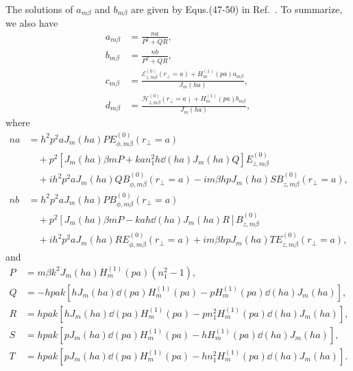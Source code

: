 The solutions of $a_{m\beta}$ and $b_{m\beta}$ are given by Equs.(47-50) in Ref.~\cite{Klimov2004}. To summarize, we also have
\begin{align}
a_{m\beta} &= \frac{na}{P^2+QR},\\
b_{m\beta} &= \frac{nb}{P^2+QR},\\
c_{m\beta} &= \frac{\mathcal{E}_{z,m\beta}^{(0)}(r\!_\perp\!=\!a)+ H_m^{(1)}(pa)a_{m\beta}}{J_m(ha)},\\
d_{m\beta} &= \frac{\mathcal{H}_{z,m\beta}^{(0)}(r\!_\perp\!=\!a)+ H_m^{(1)}(pa)b_{m\beta}}{J_m(ha)},
\end{align}
where
\begin{align}
na &= h^2p^2aJ_m(ha)PE_{\phi,m\beta}^{(0)}(r\!_\perp\!=\!a) \nonumber\\
&\quad + p^2\left[J_m(ha)\beta mP+kan_1^2h \dd{}{(ha)}J_m(ha)Q \right] E_{z,m\beta}^{(0)} \nonumber\\
&\quad + ih^2p^2 aJ_m(ha)QB_{\phi,m\beta}^{(0)}(r\!_\perp\!\!=\!a) \!-\! im\beta hpJ_m(ha)SB_{z,m\beta}^{(0)}(r\!_\perp\!\!=\!a),\\
nb &= h^2p^2aJ_m(ha)PB_{\phi,m\beta}^{(0)}(r\!_\perp\!=\!a) \nonumber\\
&\quad + p^2\left[J_m(ha)\beta mP-kah \dd{}{(ha)}J_m(ha)R \right] B_{z,m\beta}^{(0)} \nonumber\\
&\quad + ih^2p^2 aJ_m(ha)RE_{\phi,m\beta}^{(0)}(r\!_\perp\!\!=\!a) \!+\! im\beta hpJ_m(ha)TE_{z,m\beta}^{(0)}(r\!_\perp\!\!=\!a),
\end{align} 
and
\begin{align}
P &=m\beta k^2J_m(ha)H_m^{(1)}(pa)(n_1^2-1),\\
Q &=-hpak\left[ hJ_m(ha)\dd{}{(pa)}H_m^{(1)}(pa)-pH_m^{(1)}(pa)\dd{}{(ha)}J_m(ha) \right],\\
R &=hpak\left[ hJ_m(ha)\dd{}{(pa)}H_m^{(1)}(pa)-pn_1^2H_m^{(1)}(pa)\dd{}{(ha)}J_m(ha) \right],\\
S &=hpak\left[ pJ_m(ha)\dd{}{(pa)}H_m^{(1)}(pa)-hH_m^{(1)}(pa)\dd{}{(ha)}J_m(ha) \right],\\
T &=hpak\left[ pJ_m(ha)\dd{}{(pa)}H_m^{(1)}(pa)-hn_1^2H_m^{(1)}(pa)\dd{}{(ha)}J_m(ha) \right].
\end{align}

